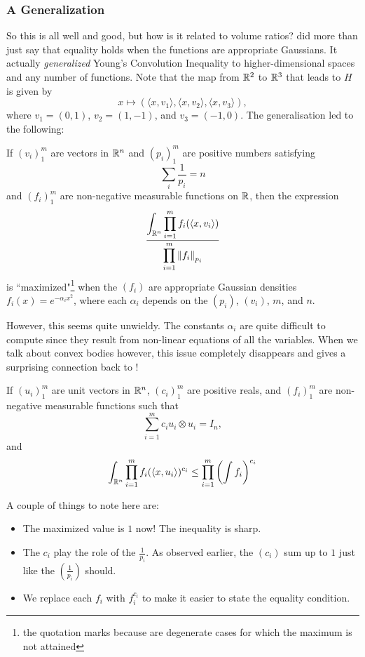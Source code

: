 \subsubsection{A Generalization}

So this is all well and good, but how is it related to volume ratios? \cite{BRASCAMP1976151} did more than just say that equality holds when the functions are appropriate Gaussians. It actually \textit{generalized} Young's Convolution Inequality to higher-dimensional spaces and any number of functions. Note that the map from $\mathbb{R}^2$ to $\mathbb{R}^3$ that leads to $H$ is given by
\[ x \mapsto (\langle x,v_1\rangle, \langle x,v_2\rangle, \langle x,v_3\rangle), \]
where $v_1 = (0,1)$, $v_2 = (1,-1)$, and $v_3 = (-1,0)$. The generalisation led to the following:
\begin{theorem}
If $(v_i)_1^m$ are vectors in $\mathbb{R}^n$ and $(p_i)_1^m$ are positive numbers satisfying
\[ \sum_i \frac{1}{p_i} = n \]
and $(f_i)_1^m$ are non-negative measurable functions on $\mathbb{R}$, then the expression
\[ \dfrac{\displaystyle\int_{\mathbb{R}^n} \displaystyle\prod_{i=1}^m f_i(\langle x,v_i\rangle) }{\displaystyle\prod_{i=1}^m \left\lVert f_i\right\rVert_{p_i}} \]
is ``maximized"\footnote{the quotation marks because are degenerate cases for which the maximum is not attained} when the $(f_i)$ are appropriate Gaussian densities $f_i(x) = e^{-\alpha_i x^2}$, where each $\alpha_i$ depends on the $(p_i)$, $(v_i)$, $m$, and $n$.
\end{theorem}

However, this seems quite unwieldy. The constants $\alpha_i$ are quite difficult to compute since they result from non-linear equations of all the variables. When we talk about convex bodies however, this issue completely disappears and gives a surprising connection back to !

\begin{ftheo}
\label{ball volume ratio estimate prereq}
If $(u_i)_1^m$ are unit vectors in $\mathbb{R}^n$, $(c_i)_1^m$ are positive reals, and $(f_i)_1^m$ are non-negative measurable functions such that
\[ \sum_{i=1}^m c_i u_i\otimes u_i = I_n, \]
and
\[ \int_{\mathbb{R}^n} \prod_{i=1}^m f_i(\langle x,u_i\rangle)^{c_i} \leq \prod_{i=1}^m \left(\int f_i\right)^{c_i} \]
\end{ftheo}

A couple of things to note here are:
\begin{itemize}
    \item The maximized value is $1$ now! The inequality is sharp.
    \item The $c_i$ play the role of the $\frac{1}{p_i}$. As observed earlier, the $(c_i)$ sum up to $1$ just like the $(\frac{1}{p_i})$ should.
    \item We replace each $f_i$ with $f_i^{c_i}$ to make it easier to state the equality condition.
\end{itemize}

